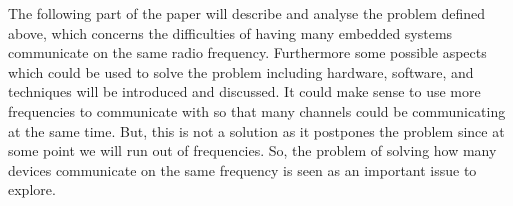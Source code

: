 \bigskip \noindent
The following part of the paper will describe and analyse the problem defined above, which concerns the difficulties of having many embedded systems communicate on the same radio frequency.
Furthermore some possible aspects which could be used to solve the problem including hardware, software, and techniques will be introduced and discussed.
It could make sense to use more frequencies to communicate with so that many channels could be communicating at the same time.
But, this is not a solution as it postpones the problem since at some point we will run out of frequencies. 
So, the problem of solving how many devices communicate on the same frequency is seen as an important issue to explore.
